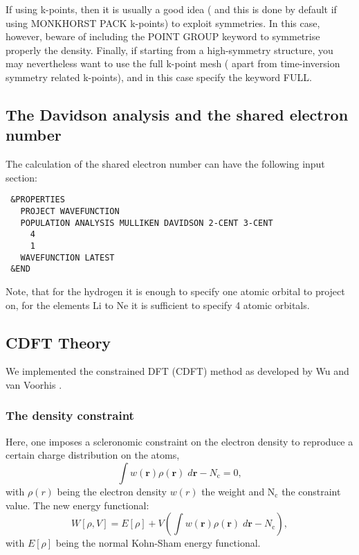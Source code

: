 \documentclass[twoside,10pt,titlepage,a4paper]{article}
\begin{document}
  If using k-points, then it is usually a good idea ( and this is done by
default if using MONKHORST PACK k-points) to exploit symmetries. In this case,
however, beware of including the POINT GROUP keyword to symmetrise properly the
density. Finally, if starting from a high-symmetry structure, you may
nevertheless want to use the full k-point mesh ( apart from time-inversion
symmetry related k-points), and in this case specify the keyword FULL.


\subsection{The Davidson analysis and the shared electron number}\label{hints:pop}
  The calculation of the shared electron number can have the following input
section:
\begin{verbatim}
 &PROPERTIES
   PROJECT WAVEFUNCTION
   POPULATION ANALYSIS MULLIKEN DAVIDSON 2-CENT 3-CENT
     4
     1
   WAVEFUNCTION LATEST
 &END
\end{verbatim}
Note, that for the hydrogen it is enough to specify one atomic orbital to
project on, for the elements Li to Ne it is sufficient to specify
4 atomic orbitals.

\subsection{CDFT Theory}\label{sec:CDFT_FO-DFT}
We implemented the constrained DFT (CDFT) method as developed by Wu and van Voorhis \cite{Wu05,Wu06jcp,Wu06jctc,Wu06jpca,Wu07}.

\subsubsection{The density constraint}
Here, one imposes a scleronomic constraint on the electron density to reproduce a certain charge distribution on the atoms,
\begin{equation}
\int w(\mathbf{r}) \rho(\mathbf{r})\; d\mathbf{r}-N_\text{c}=0,
\end{equation}
with $\rho(r)$ being the electron density $w(r)$ the weight and $\text{N}_\text{c}$ the constraint value.
The new energy functional:
\begin{equation}
W[\rho,V]=E[\rho]+V (\int w(\mathbf{r}) \rho(\mathbf{r})\; d\mathbf{r}-N_\text{c}),
\end{equation}
with $E[\rho]$ being the normal Kohn-Sham energy functional.
\end{document}
